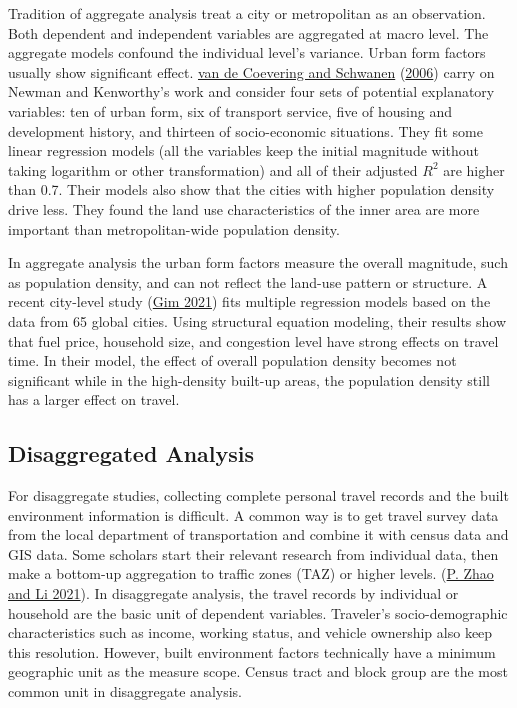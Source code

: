 \documentclass[
  11pt,
  openany]{memoir}
\begin{document}
Tradition of aggregate analysis treat a city or metropolitan as an observation. Both dependent and independent variables are aggregated at macro level. The aggregate models confound the individual level's variance. Urban form factors usually show significant effect.
\protect\hyperlink{ref-vandecoeveringReevaluatingImpactUrban2006}{van de Coevering and Schwanen} (\protect\hyperlink{ref-vandecoeveringReevaluatingImpactUrban2006}{2006}) carry on Newman and Kenworthy's work and consider four sets of potential explanatory variables: ten of urban form, six of transport service, five of housing and development history, and thirteen of socio-economic situations. They fit some linear regression models (all the variables keep the initial magnitude without taking logarithm or other transformation) and all of their adjusted \(R^2\) are higher than 0.7. Their models also show that the cities with higher population density drive less. They found the land use characteristics of the inner area are more important than metropolitan-wide population density.

In aggregate analysis the urban form factors measure the overall magnitude, such as population density, and can not reflect the land-use pattern or structure.
A recent city-level study (\protect\hyperlink{ref-gimAnalyzingCitylevelEffects2021}{Gim 2021}) fits multiple regression models based on the data from 65 global cities. Using structural equation modeling, their results show that fuel price, household size, and congestion level have strong effects on travel time. In their model, the effect of overall population density becomes not significant while in the high-density built-up areas, the population density still has a larger effect on travel.

\hypertarget{disaggregated-analysis}{%
\subsection{Disaggregated Analysis}\label{disaggregated-analysis}}

For disaggregate studies, collecting complete personal travel records and the built environment information is difficult. A common way is to get travel survey data from the local department of transportation and combine it with census data and GIS data. Some scholars start their relevant research from individual data, then make a bottom-up aggregation to traffic zones (TAZ) or higher levels. (\protect\hyperlink{ref-zhaoRethinkingDeterminantsVehicle2021}{P. Zhao and Li 2021}).
In disaggregate analysis, the travel records by individual or household are the basic unit of dependent variables. Traveler's socio-demographic characteristics such as income, working status, and vehicle ownership also keep this resolution. However, built environment factors technically have a minimum geographic unit as the measure scope. Census tract and block group are the most common unit in disaggregate analysis.
\end{document}
